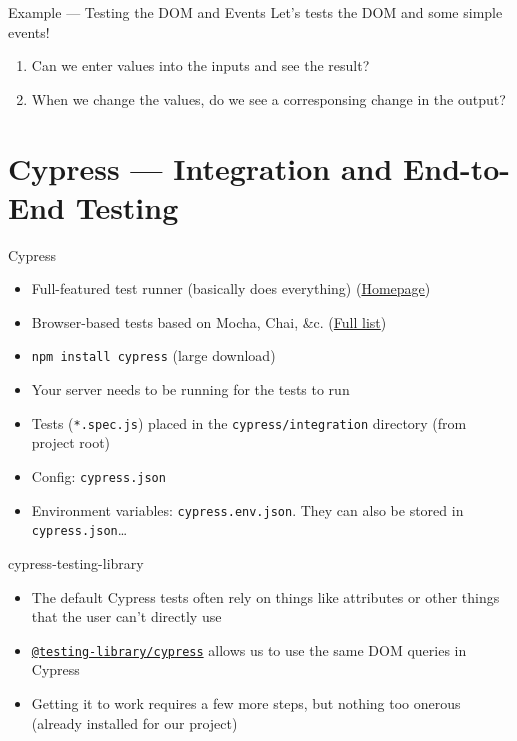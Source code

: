 \documentclass[t]{beamer}
\begin{document}
	\begin{frame}{Example --- Testing the DOM and Events}
		Let's tests the DOM and some simple events!

		\begin{enumerate}
			\item Can we enter values into the inputs and see the result?
			\item When we change the values, do we see a corresponsing change in the output?
		\end{enumerate}

		\framebreak

		
		
	\end{frame}



	\section{Cypress --- Integration and End-to-End Testing}
	\begin{frame}[fragile]{Cypress}
		\begin{itemize}
			\item Full-featured test runner (basically does everything) (\href{https://www.cypress.io/}{Homepage})
			\item Browser-based tests based on Mocha, Chai, \&c. (\href{https://docs.cypress.io/guides/references/bundled-tools.html#Other-Library-Utilities}{Full list})
			\item \texttt{npm install cypress} (large download)
			\item Your server needs to be running for the tests to run
			\item Tests (\texttt{*.spec.js}) placed in the \texttt{cypress/integration} directory (from project root)
			\item Config: \texttt{cypress.json}
			\item Environment variables: \texttt{cypress.env.json}. They can also be stored in \texttt{cypress.json}\dots
		\end{itemize}
	\end{frame}

	\begin{frame}[fragile]{cypress-testing-library}
		\begin{itemize}
			\item The default Cypress tests often rely on things like attributes or other things that the user can't directly use
			\item \href{https://github.com/testing-library/cypress-testing-library}{\texttt{@testing-library/cypress}} allows us to use the same DOM queries in Cypress
			\item Getting it to work requires a few more steps, but nothing too onerous (already installed for our project)
		\end{itemize}
	\end{frame}
\end{document}
